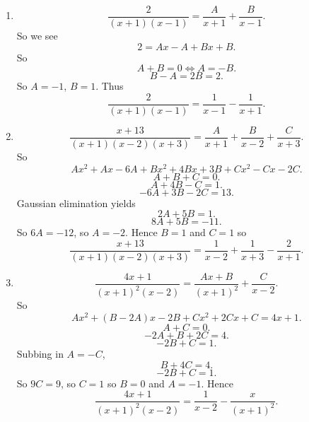 \begin{enumerate}
\item
\[
\frac{2}{(x+1)(x-1)} = \frac{A}{x+1} + \frac{B}{x-1}.
\]
So we see
\[
2 = Ax - A + Bx + B.
\]
So
\[
A + B = 0 \iff A = -B.
\]
\[
B-A = 2B = 2. 
\]
So $A= -1$, $B=1$.
Thus
\[
\frac{2}{(x+1)(x-1)} = \frac{1}{x-1} - \frac{1}{x+1}.
\]
\item
\[
\frac{x+13}{(x+1)(x-2)(x+3)} = \frac{A}{x+1} + \frac{B}{x-2} + \frac{C}{x+3}.
\]
So
\[
Ax^2 +Ax - 6A + Bx^2 + 4Bx + 3B + Cx^2 -Cx -2C.
\]
\[
A + B + C = 0.
\]
\[
A + 4B - C = 1.
\]
\[
-6A+3B-2C =13. 
\]
Gaussian elimination yields
\[
2A + 5B = 1.
\]
\[
8A + 5B = -11.
\]
So $6A = -12$, so $A = -2$. Hence $B = 1$ and $C = 1$ so
\[
\frac{x+13}{(x+1)(x-2)(x+3)} = \frac{1}{x-2} + \frac{1}{x+3} - \frac{2}{x+1}.
\]
\item
\[
\frac{4x+1}{(x+1)^2(x-2)} = \frac{Ax + B}{(x+1)^2} + \frac{C}{x-2}.
\]
So 
\[
Ax^2 + (B-2A)x -2B + Cx^2 + 2Cx + C = 4x+1.
\]
\[
A + C= 0.
\]
\[
-2A + B + 2C= 4.
\]
\[
-2B + C = 1.
\]
Subbing in $A = -C$,
\[
B + 4C = 4.
\]
\[
-2B + C = 1.
\]
So $9C = 9$, so $C=1$ so $B = 0$ and $A = -1$. Hence
\[
\frac{4x+1}{(x+1)^2(x-2)} = \frac{1}{x-2} - \frac{x}{(x+1)^2}.
\]
\end{enumerate}